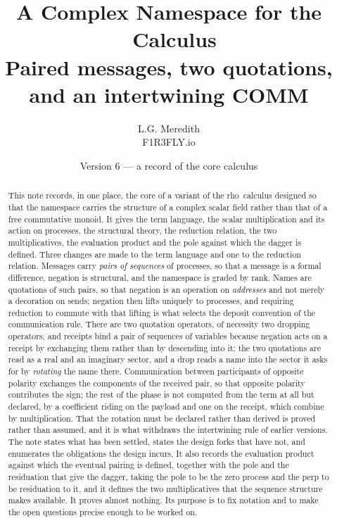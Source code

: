 \documentclass[11pt]{article}
\title{A Complex Namespace for the \rhoc\ Calculus\\[2mm]
\large Paired messages, two quotations, and an intertwining COMM}
\author{L.G. Meredith\\ \small F1R3FLY.io}
\date{Version 6 --- a record of the core calculus}
\theoremstyle{definition}
\theoremstyle{remark}
\newcommand{\rhoc}{\textsf{rho}}
\begin{document}
\maketitle

\begin{abstract}
This note records, in one place, the core of a variant of the \rhoc\ calculus
designed so that the namespace carries the structure of a complex scalar field
rather than that of a free commutative monoid. It gives the term language, the
scalar multiplication and its action on processes, the structural theory, the
reduction relation, the two multiplicatives, the evaluation product and the pole
against which the dagger is defined. Three changes are made to the
term language and one to the reduction relation. Messages carry \emph{pairs of
sequences} of processes, so that a message is a formal difference, negation is
structural, and the namespace is graded by rank. Names are quotations of such
pairs, so that negation is an operation on \emph{addresses} and not merely a
decoration on sends; negation then lifts uniquely to processes, and requiring
reduction to commute with that lifting is what selects the deposit convention of
the communication rule. There are two quotation
operators, of necessity two dropping operators, and receipts bind a pair of
sequences of variables because negation acts on a receipt by exchanging them
rather than by descending into it; the two quotations are read
as a real and an imaginary sector, and a drop reads a name into the sector it
asks for by \emph{rotating} the name there. Communication between participants
of opposite polarity exchanges the components of the received pair, so that
opposite polarity contributes the sign; the rest of the phase is not computed
from the term at all but declared, by a coefficient riding on the payload and
one on the receipt, which combine by multiplication. That the rotation must be
declared rather than derived is proved rather than assumed, and it is what
withdraws the intertwining rule of earlier versions. The note
states what has been settled, states the design forks that have not, and
enumerates the obligations the design incurs. It also records the evaluation
product against which the eventual pairing is defined, together with the pole
and the residuation that give the dagger, taking the pole to be the zero process
and the perp to be residuation to it, and it defines the two multiplicatives
that the sequence structure makes available. It proves almost nothing. Its
purpose is to fix notation and to make the open questions precise enough to be
worked on.
\end{abstract}
\end{document}
